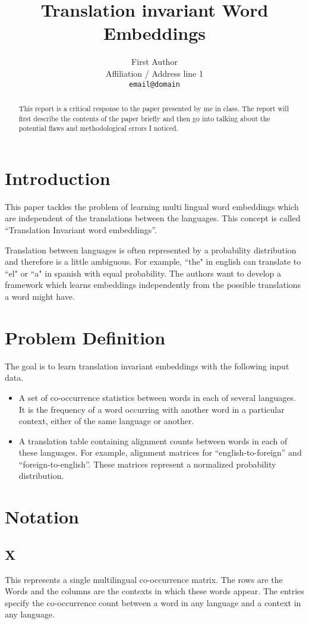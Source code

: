 \documentclass[11pt]{article}
\title{Translation invariant Word Embeddings}
\author{First Author \\
  Affiliation / Address line 1 \\
  {\tt email@domain}}
\date{}
\begin{document}
\maketitle
\begin{abstract}
This report is a critical response to the paper \cite{huang2015translation} presented by me in class. The report will first describe the contents of the paper briefly and then go into talking about the potential flaws and methodological errors I noticed.
\end{abstract}

\section{Introduction}
This paper tackles the problem of learning multi lingual word embeddings which are independent of the translations between the languages.  This concept is called “Translation Invariant word embeddings”.

Translation between languages is often represented by a probability distribution and therefore is a little ambiguous. For example, ``the" in english can translate to ``el" or ``a" in spanish with equal probability. The authors want to develop a framework which learns embeddings independently from the possible translations a word might have.

\section{Problem Definition}
The goal is to learn translation invariant embeddings with the following input data.
\begin{itemize}
\item A set of co-occurrence statistics between words in each of several languages. It is the frequency of a word occurring with another word in a particular context, either of the same language or another. 
\item A translation table containing alignment counts between words in each of these languages. For example, alignment matrices for “english-to-foreign” and “foreign-to-english”. These matrices represent a normalized probability distribution.
\end{itemize}

\section{Notation}

\subsection{X}
This represents a single multilingual co-occurrence matrix. The rows are the Words and the columns are the contexts in which these words appear. The entries specify the co-occurrence count between a word in any language and a context in any language.
\end{document}

